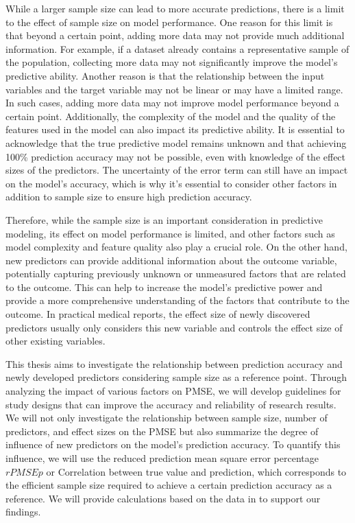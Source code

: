While a larger sample size can lead to more accurate predictions, there is a limit to the effect of sample size on model performance. One reason for this limit is that beyond a certain point, adding more data may not provide much additional information. For example, if a dataset already contains a representative sample of the population, collecting more data may not significantly improve the model's predictive ability. Another reason is that the relationship between the input variables and the target variable may not be linear or may have a limited range. In such cases, adding more data may not improve model performance beyond a certain point. Additionally, the complexity of the model and the quality of the features used in the model can also impact its predictive ability.  It is essential to acknowledge that the true predictive model remains unknown and that achieving 100\% prediction accuracy may not be possible, even with knowledge of the effect sizes of the predictors. The uncertainty of the error term can still have an impact on the model's accuracy, which is why it's essential to consider other factors in addition to sample size to ensure high prediction accuracy.

Therefore, while the sample size is an important consideration in predictive modeling, its effect on model performance is limited, and other factors such as model complexity and feature quality also play a crucial role. On the other hand, new predictors can provide additional information about the outcome variable, potentially capturing previously unknown or unmeasured factors that are related to the outcome. This can help to increase the model's predictive power and provide a more comprehensive understanding of the factors that contribute to the outcome. In practical medical reports, the effect size of newly discovered predictors usually only considers this new variable and controls the effect size of other existing variables.


This thesis aims to investigate the relationship between prediction accuracy and newly developed predictors considering sample size as a reference point. Through analyzing the impact of various factors on PMSE, we will develop guidelines for study designs that can improve the accuracy and reliability of research results. We will not only investigate the relationship between sample size, number of predictors, and effect sizes on the PMSE but also summarize the degree of influence of new predictors on the model's prediction accuracy. To quantify this influence, we will use the reduced prediction mean square error percentage $rPMSEp$ or Correlation between true value and prediction, which corresponds to the efficient sample size required to achieve a certain prediction accuracy as a reference. We will provide calculations based on the data in \cite{baker2008chronicpain} to support our findings.